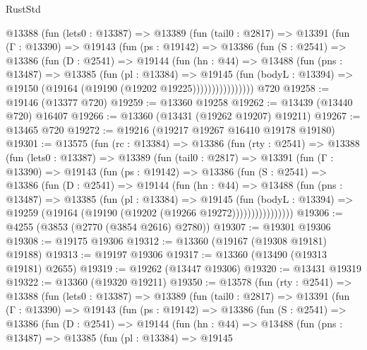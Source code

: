 \begin{lexlean}{RustStd}
\begin{coremodule}
        @13388
          (fun (lets0 : @13387) =>
          @13389
            (fun (tail0 : @2817) =>
            @13391
              (fun (Γ : @13390) =>
              @19143
                (fun (ps : @19142) =>
                @13386
                  (fun (S : @2541) =>
                  @13386
                    (fun (D : @2541) =>
                    @19144
                      (fun (hn : @44) =>
                      @13488
                        (fun (pns : @13487) =>
                        @13385
                          (fun (pl : @13384) =>
                          @19145
                            (fun (bodyL : @13394) =>
                            @19150 (@19164 (@19190 (@19202 @19225))))))))))))))))
    @720
@19258 := @19146 (@13377 @720)
@19259 := @13360 @19258
@19262 := @13439 (@13440 @720) @16407
@19266 := @13360 (@13431 (@19262 @19207) @19211)
@19267 := @13465 @720
@19272 := @19216 (@19217 @19267 @16410 @19178 @19180)
@19301 := @13575
    (fun (rc : @13384) =>
    @13386
      (fun (rty : @2541) =>
      @13388
        (fun (lets0 : @13387) =>
        @13389
          (fun (tail0 : @2817) =>
          @13391
            (fun (Γ : @13390) =>
            @19143
              (fun (ps : @19142) =>
              @13386
                (fun (S : @2541) =>
                @13386
                  (fun (D : @2541) =>
                  @19144
                    (fun (hn : @44) =>
                    @13488
                      (fun (pns : @13487) =>
                      @13385
                        (fun (pl : @13384) =>
                        @19145
                          (fun (bodyL : @13394) =>
                          @19259 (@19164 (@19190 (@19202 (@19266 @19272))))))))))))))))
@19306 := @4255 (@3853 (@2770 (@3854 @2616) @2780))
@19307 := @19301 @19306
@19308 := @19175 @19306
@19312 := @13360 (@19167 (@19308 @19181) @19188)
@19313 := @19197 @19306
@19317 := @13360 (@13490 (@19313 @19181) @2655)
@19319 := @19262 (@13447 @19306)
@19320 := @13431 @19319
@19322 := @13360 (@19320 @19211)
@19350 := @13578
    (fun (rty : @2541) =>
    @13388
      (fun (lets0 : @13387) =>
      @13389
        (fun (tail0 : @2817) =>
        @13391
          (fun (Γ : @13390) =>
          @19143
            (fun (ps : @19142) =>
            @13386
              (fun (S : @2541) =>
              @13386
                (fun (D : @2541) =>
                @19144
                  (fun (hn : @44) =>
                  @13488
                    (fun (pns : @13487) =>
                    @13385
                      (fun (pl : @13384) =>
                      @19145

\end{coremodule}
\end{lexlean}
